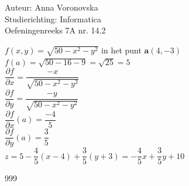 \documentclass[a4paper]{article}
\begin{document}
  
\noindent \large Auteur: Anna Voronovska \\
\noindent \large Studierichting: Informatica\\
\noindent \large Oefeningenreeks 7A nr. 14.2\\

\medskip

\normalsize

$f(x,y) = \sqrt{50-x^2-y^2}$ in het punt $\mathbf{a}(4,-3)$\\

$f(a) = \sqrt{50-16-9} = \sqrt{25} = 5$\\

$\dfrac{\partial f}{\partial x} = \dfrac{-x}{\sqrt{50-x^2-y^2}}$\\

$\dfrac{\partial f}{\partial y} = \dfrac{-y}{\sqrt{50-x^2-y^2}}$\\

$\dfrac{\partial f}{\partial x}(a) = \dfrac{-4}{5}$\\

$\dfrac{\partial f}{\partial y}(a) = \dfrac{3}{5}$\\

$z = 5 - \dfrac{4}{5}(x-4) + \dfrac{3}{5}(y+3) = -\dfrac{4}{5}x + \dfrac{3}{5}y + 10$\\

\begin{thebibliography}{999}
\end{thebibliography}
\end{document}

